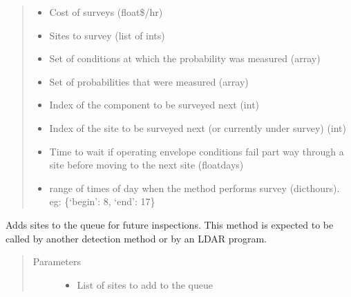 \documentclass[letterpaper,10pt,english]{sphinxmanual}
\begin{document}
\begin{fulllineitems}
\begin{quote}
\begin{description}
\begin{itemize}
\item {} 
 \textendash{} Cost of surveys (float\textendash{}\$/hr)

\item {} 
 \textendash{} Sites to survey (list of ints)

\item {} 
 \textendash{} Set of conditions at which the probability was measured (array)

\item {} 
 \textendash{} Set of probabilities that were measured (array)

\item {} 
 \textendash{} Index of the component to be surveyed next (int)

\item {} 
 \textendash{} Index of the site to be surveyed next (or currently under survey) (int)

\item {} 
 \textendash{} Time to wait if operating envelope conditions fail part way through a site before
moving to the next site (float\textendash{}days)

\item {} 
 \textendash{} range of times of day when the method performs survey (dict\textendash{}hours). eg: \{‘begin’: 8, ‘end’: 17\}

\end{itemize}

\end{description}\end{quote}

\begin{fulllineitems}
\label{\detokenize{index:feast.DetectionModules.comp_survey.CompSurvey.action}}
Adds sites to the queue for future inspections. This method is expected to be called by another detection
method or by an LDAR program.
\begin{quote}\begin{description}
\item[{Parameters}] \leavevmode\begin{itemize}
\item {} 
 \textendash{} List of sites to add to the queue


\end{itemize}
\end{description}
\end{quote}
\end{fulllineitems}
\end{fulllineitems}
\end{document}
